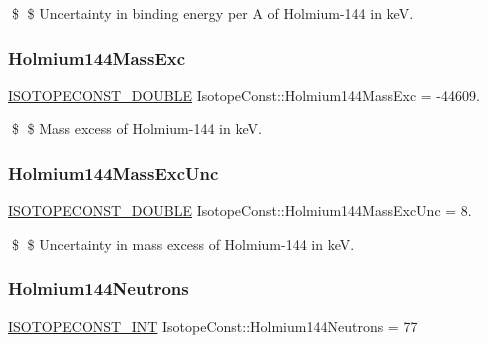 \$ \$ Uncertainty in binding energy per A of Holmium-\/144 in keV. \mbox{\label{group___isotope_const-_holmium-_ho144_gafd16195f24dcd22f4d23fee1fe41f209}} 
\subsubsection{\texorpdfstring{Holmium144\+Mass\+Exc}{Holmium144MassExc}}
{\footnotesize\ttfamily \mbox{\hyperlink{group___isotope_const-_macros_ga8f45a7272ce02c0b4c65c44636ed719a}{I\+S\+O\+T\+O\+P\+E\+C\+O\+N\+S\+T\+\_\+\+D\+O\+U\+B\+LE}} Isotope\+Const\+::\+Holmium144\+Mass\+Exc = -\/44609.}

\$ \$ Mass excess of Holmium-\/144 in keV. \mbox{\label{group___isotope_const-_holmium-_ho144_ga936bb2615ece181c4c55fea658822b71}} 
\subsubsection{\texorpdfstring{Holmium144\+Mass\+Exc\+Unc}{Holmium144MassExcUnc}}
{\footnotesize\ttfamily \mbox{\hyperlink{group___isotope_const-_macros_ga8f45a7272ce02c0b4c65c44636ed719a}{I\+S\+O\+T\+O\+P\+E\+C\+O\+N\+S\+T\+\_\+\+D\+O\+U\+B\+LE}} Isotope\+Const\+::\+Holmium144\+Mass\+Exc\+Unc = 8.}

\$ \$ Uncertainty in mass excess of Holmium-\/144 in keV. \mbox{\label{group___isotope_const-_holmium-_ho144_ga454126675d1ab1013dcb3e781d7d4861}} 
\subsubsection{\texorpdfstring{Holmium144\+Neutrons}{Holmium144Neutrons}}
{\footnotesize\ttfamily \mbox{\hyperlink{group___isotope_const-_macros_ga5f18360b3e99483a35c32d789e62621c}{I\+S\+O\+T\+O\+P\+E\+C\+O\+N\+S\+T\+\_\+\+I\+NT}} Isotope\+Const\+::\+Holmium144\+Neutrons = 77}

